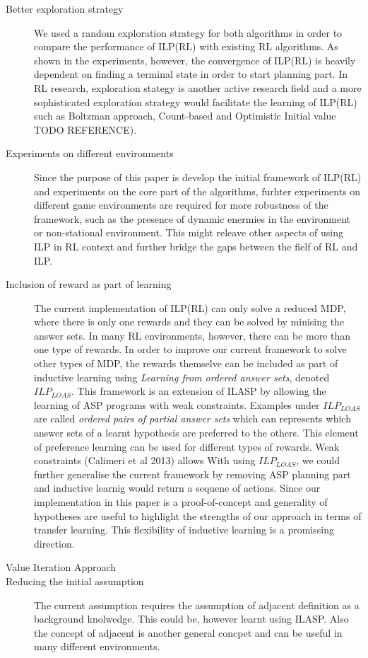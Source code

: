 \begin{description}
    \item[Better exploration strategy]
    We used a random exploration strategy for both algorithms in order to compare the performance of ILP(RL) with existing RL algorithms. 
    As shown in the experiments, however, the convergence of ILP(RL) is heavily dependent on finding a terminal state in order to start planning part.
    In RL research, exploration stategy is another active research field and a more sophisticated exploration strategy would facilitate the learning of ILP(RL)
    such as Boltzman approach, Count-based and Optimistic Initial value TODO REFERENCE).

    \item[Experiments on different environments]
    Since the purpose of this paper is develop the initial framework of ILP(RL) and experiments on the core part of the algorithms,
    furhter experiments on different game environments are required for more robustness of the framework, such as the presence of dynamic enermies in the environment or non-stational environment.
    This might releave other aspects of using ILP in RL context and further bridge the gaps between the fielf of RL and ILP.

    \item[Inclusion of reward as part of learning]
    The current implementation of ILP(RL) can only solve a reduced MDP, where there is only one rewards and they can be solved by minising the answer sets.
    In many RL environments, however, there can be more than one type of rewards. In order to improve our current framework to solve other types of MDP, 
    the rewards themselve can be included as part of inductive learning using \textit{Learning from ordered answer sets}, denoted $ILP_{LOAS}$. 
    This framework is an extension of ILASP by allowing the learning of ASP programs with weak constraints.
    Examples under $ILP_{LOAS}$ are called \textit{ordered pairs of partial answer sets} which can represents which answer sets of a learnt hypothesis are preferred to the others.
    This element of preference learning can be used for different types of rewards. 
    Weak constraints (Calimeri et al 2013) allows 
    With using $ILP_{LOAS}$, we could further generalise the current framework by removing ASP planning part and inductive learnig would return a sequene of actions. 
    Since our implementation in this paper is a proof-of-concept and generality of hypotheses are useful to highlight the strengths of our approach in terms of transfer learning.
    This flexibility of inductive learning is a promissing direction.
    \item[Value Iteration Approach]
    \item[Reducing the initial assumption]
    The current assumption requires the assumption of adjacent definition as a background knolwedge. This could be, however learnt using ILASP.
    Also the concept of adjacent is another general concpet and can be useful in many different environments.
\end{description}

